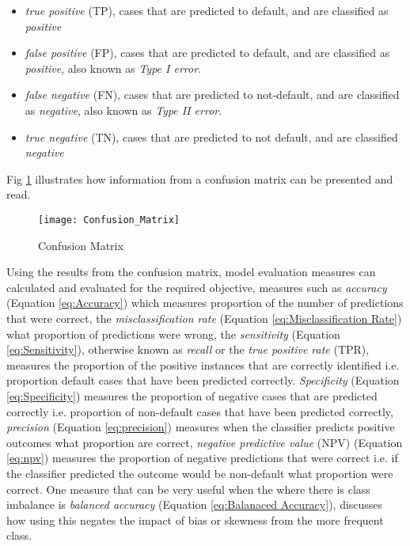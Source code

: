\begin{itemize}
	\item \textit{true positive} (TP), cases that are predicted to default, and are {\color{green}{correctly}} classified as \textit{positive}
	\item \textit{false positive} (FP), cases that are predicted to default, and are {\color{red}{incorrectly}} classified as \textit{positive}, also known as \textit{Type I error}.
	\item \textit{false negative} (FN), cases that are predicted to not-default, and are {\color{red}{incorrectly}} classified as \textit{negative}, also known as \textit{Type II error}.
	\item  \textit{true negative} (TN), cases that are predicted to not default, and are {\color{green}{correctly}} classified \textit{negative}
	
\end{itemize}

Fig \ref{fig:ConfusionMatrix} illustrates how information from a confusion matrix can be presented and read.

\begin{figure}[H]
	\texttt{[image: Confusion\_Matrix]}
	\caption[Confusion Matrix]
	{Confusion Matrix}
	\label{fig:ConfusionMatrix}
\end{figure}

Using the results from the confusion matrix, model evaluation measures can calculated and evaluated for the required objective, measures such as \textit{accuracy} (Equation \ref{eq:Accuracy}) which measures proportion of the number of predictions that were correct, the \textit{misclassification rate} (Equation \ref{eq:Misclassification Rate}) what proportion of predictions were wrong, the \textit{sensitivity} (Equation \ref{eq:Sensitivity}), otherwise known as \textit{recall} or the \textit{true positive rate} (TPR), measures the proportion of the positive instances that are correctly identified i.e. proportion default cases that have been predicted correctly. \textit{Specificity} (Equation \ref{eq:Specificity}) measures the proportion of negative cases that are predicted correctly i.e. proportion of non-default cases that have been predicted correctly, \textit{precision} (Equation \ref{eq:precision}) measures when the classifier predicts positive outcomes what proportion are correct, \textit{negative predictive value} (NPV) (Equation \ref{eq:npv}) measures the proportion of negative predictions that were correct i.e. if the classifier predicted the outcome would be non-default what proportion were correct. One measure that can be very useful when the where there is class imbalance is \textit{balanced accuracy} (Equation \ref{eq:Balanaced Accuracy}), \citep{brodersen_balanced_2010} discusses how using this negates the impact of bias or skewness from the more frequent class.

